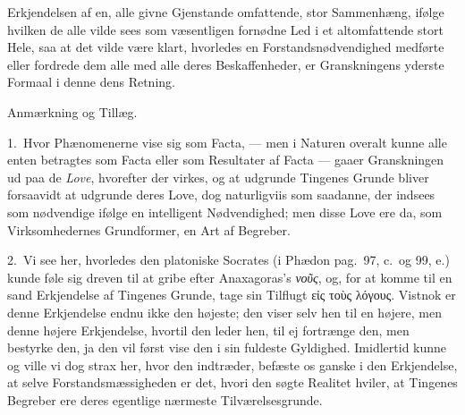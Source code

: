 \documentclass[12pt,a4paper]{book}
\newcommand{\apage}[1]{\marginnote{\footnotesize\textit{[#1]}}}
\begin{document}
Erkjendelsen af en, alle givne Gjenstande omfattende, stor Sammenhæng, ifølge
hvilken de alle \apage{91}  vilde sees som væsentligen fornødne Led i et altomfattende stort
Hele, saa at det vilde være klart, hvorledes en Forstandsnødvendighed medførte
eller fordrede dem alle med alle deres Beskaffenheder, er Granskningens yderste
Formaal i denne dens Retning.

\begin{center}Anmærkning og Tillæg.\end{center}

1.~Hvor Phænomenerne vise sig som Facta, --- men i Naturen overalt kunne alle
enten betragtes som Facta eller som Resultater af Facta --- gaaer Granskningen ud
paa de \emph{Love}, hvorefter der virkes, og at udgrunde Tingenes Grunde bliver
forsaavidt at udgrunde deres Love, dog naturligviis som saadanne, der indsees som
nødvendige ifølge en intelligent Nødvendighed; men disse Love ere da, som
Virksomhedernes Grundformer, en Art af Begreber.

2.~Vi see her, hvorledes den platoniske Socrates (i Phædon pag.\ 97, c.\ og 99,
e.) kunde føle sig dreven til at gribe efter Anaxagoras's \emph{νοῦς}, og, for at komme
til en sand Erkjendelse af Tingenes Grunde, tage sin Tilflugt εἰς τοὺς λόγους.%
 Vistnok er denne Erkjendelse endnu ikke den højeste; den viser selv hen til en
højere, men denne højere Erkjendelse, hvortil den leder hen, til ej fortrænge
den, men bestyrke den, ja den vil først vise den i sin fuldeste Gyldighed.
Imidlertid kunne og ville vi dog strax her, hvor den \apage{92}  indtræder, befæste os ganske
i den Erkjendelse, at selve Forstandsmæssigheden er det, hvori den søgte Realitet
hviler, at Tingenes Begreber ere deres egentlige nærmeste Tilværelsesgrunde.
\end{document}
